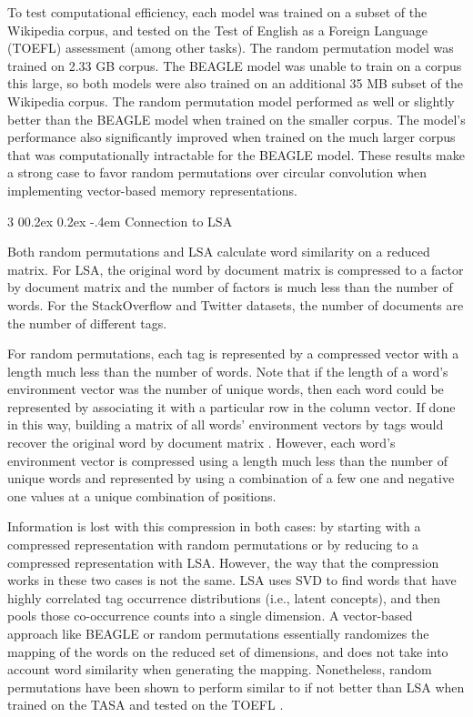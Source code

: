 \documentclass[man,floatsintext,donotrepeattitle]{apa6}
\makeatletter
\renewcommand{\subsubsection}{%
  \@startsection
  {subsubsection}%
  {3}%
  {\parindent}%
  {0\baselineskip \@plus 0.2ex \@minus 0.2ex}%
  {-.4em}%
  {\normalfont\normalsize\bfseries\addperi}}
\makeatother
\begin{document}
To test computational efficiency, each model was trained on a subset of the Wikipedia corpus, and tested on the Test of English as a Foreign Language (TOEFL) assessment (among other tasks).
The random permutation model was trained on \num{2.33} GB corpus.
The BEAGLE model was unable to train on a corpus this large, so both models were also trained on an additional \num{35} MB subset of the Wikipedia corpus.
The random permutation model performed as well or slightly better than the BEAGLE model when trained on the smaller corpus.
The model's performance also significantly improved when trained on the much larger corpus that was computationally intractable for the BEAGLE model.
These results make a strong case to favor random permutations over circular convolution when implementing vector-based memory representations.

\subsubsection{Connection to LSA}

Both random permutations and LSA calculate word similarity on a reduced matrix.
For LSA, the original word by document matrix is compressed to a factor by document matrix and the number of factors is much less than the number of words.
For the StackOverflow and Twitter datasets, the number of documents are the number of different tags.

For random permutations, each tag is represented by a compressed vector with a length much less than the number of words.
Note that if the length of a word's environment vector was the number of unique words, then each word could be represented by associating it with a particular row in the column vector.
If done in this way, building a matrix of all words' environment vectors by tags would recover the original word by document matrix \parencite{Kanerva2000}.
However, each word's environment vector is compressed using a length much less than the number of unique words and represented by using a combination of a few one and negative one values at a unique combination of positions. 

Information is lost with this compression in both cases: by starting with a compressed representation with random permutations or by reducing to a compressed representation with LSA.
However, the way that the compression works in these two cases is not the same.
LSA uses SVD to find words that have highly correlated tag occurrence distributions (i.e., latent concepts), and then pools those co-occurrence counts into a single dimension.
A vector-based approach like BEAGLE or random permutations essentially randomizes the mapping of the words on the reduced set of dimensions, and does not take into account word similarity when generating the mapping.
Nonetheless, random permutations have been shown to perform similar to if not better than LSA when trained on the TASA and tested on the TOEFL \parencites{Sahlgren2008,Jones2007}.
\end{document}
